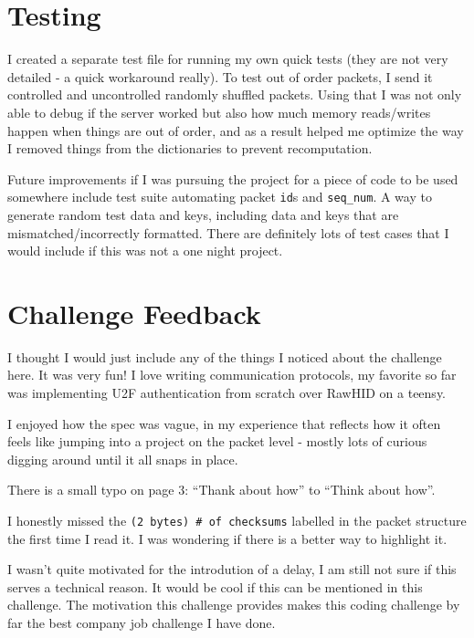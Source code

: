 \documentclass[acmtog,review]{acmart}
\begin{document}
\section{Testing}

I created a separate test file for running my own quick tests 
(they are not very detailed - a quick workaround really).
To test out of order packets, I send it controlled and uncontrolled
randomly shuffled packets. Using that I was not only able to
debug if the server worked but also how much memory reads/writes
happen when things are out of order, and as a result helped me
optimize the way I removed things from the dictionaries to prevent
recomputation.

Future improvements if I was pursuing the project for a piece of code
to be used somewhere include test suite automating packet \texttt{id}s and 
\texttt{seq\_num}. A way to generate random test data and keys, including
data and keys that are mismatched/incorrectly formatted. There are definitely
lots of test cases that I would include if this was not a one night project.

\section{Challenge Feedback}

I thought I would just include any of the things I noticed
about the challenge here. It was very fun! I love writing
communication protocols, my favorite so far was implementing
U2F authentication from scratch over RawHID on a teensy.

I enjoyed how the spec was vague, in my experience that
reflects how it often feels like jumping into a project
on the packet level - mostly lots of curious digging 
around until it all snaps in place.

There is a small typo on page 3: ``Thank about how'' to 
``Think about how''.

I honestly missed the \texttt{(2 bytes) \# of checksums}
labelled in the packet structure the first time I read it.
I was wondering if there is a better way to highlight it.

I wasn't quite motivated for the introdution of a delay,
I am still not sure if this serves a technical reason. It
would be cool if this can be mentioned in this challenge.
The motivation this challenge provides makes this
coding challenge by far the best company job challenge
I have done.
\end{document}
